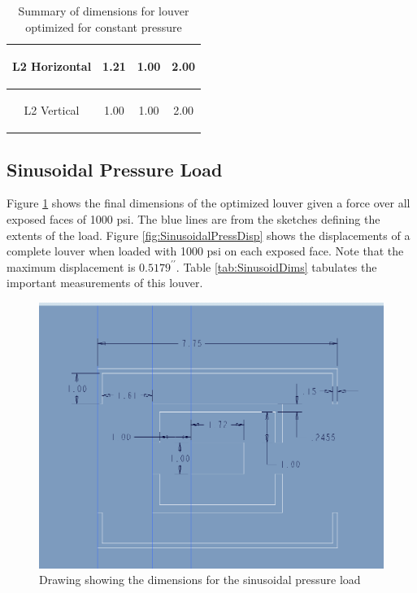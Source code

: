 \documentclass[12pt,letterpaper]{report}
\newcommand{\inchsign}{^{\prime\prime}} %
\begin{document}
\begin{table}[H]
\begin{tabular}{|c|c|c|c|}
			\hline L2 Horizontal  & 1.21 & \begin{small}
			1.00
			\end{small} & \begin{small}
			2.00
			\end{small}\\
			
			\hline L2 Vertical  & 1.00 & \begin{small}
			1.00
			\end{small} & \begin{small}
			2.00
			\end{small}\\
			
			\hline
			\end{tabular}
			\caption{Summary of dimensions for louver optimized for constant pressure}
			\label{tab:PressureDims}
		\end{table}
		
		
		\newpage
		\subsection{Sinusoidal Pressure Load}
		Figure \ref{fig:SinusoidPressureDraw} shows the final dimensions of the optimized louver given a force over all exposed faces of 1000 psi.  The blue lines are from the sketches defining the extents of the load.  Figure \ref{fig:SinusoidalPressDisp} shows the displacements of a complete louver when loaded with 1000 psi on each exposed face.  Note that the maximum displacement is $0.5179\inchsign$.  Table \ref{tab:SinusoidDims} tabulates the important measurements of this louver.
		
		\graphicspath{ {./ScreenShots/Sinusoidal/} }
		\begin{figure}[h]
			\centering
			\includegraphics[width=.75\textwidth]{SinusoidalMeasurements}
			\caption{Drawing showing the dimensions for the sinusoidal pressure load}
			\label{fig:SinusoidPressureDraw}
		\end{figure}
		
\end{document}
